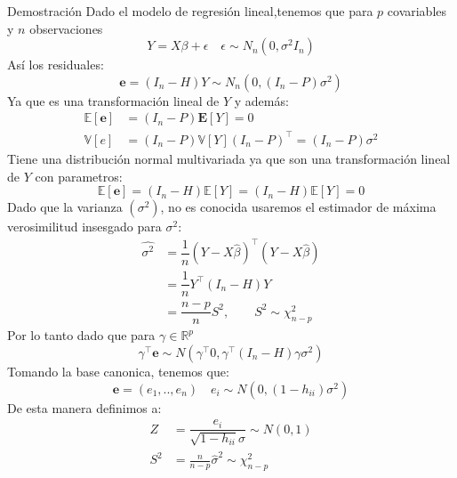 \documentclass[a4paper,11pt]{article}
\begin{document}
\begin{demostracion}{Demostración}
Dado el modelo de regresión lineal,tenemos que para $p$ covariables y $n$ observaciones
\[
Y=X\beta+\epsilon\quad \epsilon\sim N_n(0, \sigma^2I_n)
\]
Así los residuales:
\[
\mathbf{e}=(I_n-H)Y\sim N_n(0, (I_n-P)\sigma^2)
\]
Ya que es una transformación lineal de $Y$ y además:
\begin{align*}
    \mathbb{E}[\mathbf{e}]&=(I_n-P)\mathbf{E}[Y]=0\\
    \mathbb{V}[e]&=(I_n-P)\mathbb{V}[Y](I_n-P)^\top=(I_n-P)\sigma^2
\end{align*}
Tiene una distribución normal multivariada ya que son una transformación lineal de $Y$ con parametros:
\[
\mathbb{E}[\mathbf{e}]=
(I_n-H)\mathbb{E}[Y]=(I_n-H)
\mathbb{E}[Y]=0
\]
Dado que la varianza $(\sigma^2)$, no es conocida usaremos el estimador de máxima verosimilitud insesgado para $\sigma^2$:
\begin{align*}
    \hat{\sigma^2}&=\dfrac{1}{n}(Y-X\hat{\beta})^\top(Y-X\hat{\beta})\\
    &=\dfrac{1}{n}Y^\top(I_n-H)Y\\
    &=\dfrac{n-p}{n}S^2, \quad\quad S^2\sim \chi^2_{n-p}
\end{align*}
Por lo tanto dado que para $\gamma\in \mathbb{R}^p$
\[
\gamma^\top \mathbf{e}\sim N(\gamma^\top 0, \gamma^\top (I_n-H)\gamma\sigma^2)
\]
Tomando la base canonica, tenemos que:
\[
\mathbf{e}=(e_1,..,e_n)\quad e_i\sim N(0, (1-h_{ii} )\sigma^2)
\]
De esta manera definimos a:
\begin{align*}
    Z&=\dfrac{e_i}{\sqrt{1-h_{ii} }\sigma}\sim N(0,1)\\
    S^2&=\frac{n}{n-p}\hat{\sigma}^2\sim \chi^2_{n-p}
\end{align*}
\end{demostracion}
\end{document}
